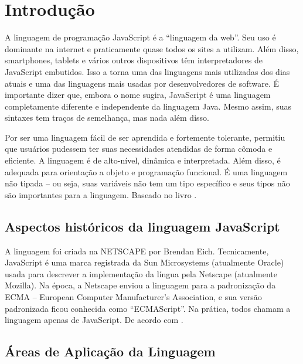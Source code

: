 



\chapter{ Introdu\c{c}\~{a}o}

A linguagem de programação JavaScript é a “linguagem da web”. Seu uso é dominante na internet e praticamente quase todos os sites a utilizam. 
Além disso, smartphones, tablets e vários outros dispositivos têm interpretadores de JavaScript embutidos. 
Isso a torna uma das linguagens mais utilizadas dos dias atuais e uma das linguagens mais usadas por desenvolvedores de software. 
É importante dizer que, embora o nome sugira, JavaScript é uma linguagem completamente diferente e independente da linguagem Java. 
Mesmo assim, suas sintaxes tem traços de semelhança, mas nada além disso. \newline

Por ser uma linguagem fácil de ser aprendida e fortemente tolerante, permitiu que usuários pudessem ter suas necessidades 
atendidas de forma cômoda e eficiente.
 A linguagem é de alto-nível, dinâmica e interpretada. Além disso, é adequada para orientação a objeto e programação funcional. 
 É uma linguagem não tipada – ou seja, suas variáveis não tem um tipo específico e seus tipos não são importantes para a linguagem. 
Baseado no livro \cite{flanagan2020javascript}.

\section{Aspectos hist\'{o}ricos da linguagem JavaScript}
   
A linguagem foi criada na NETSCAPE por Brendan Eich. Tecnicamente, JavaScript é uma marca registrada da Sun Microsystems (atualmente Oracle) usada para descrever a implementação da língua pela Netscape (atualmente Mozilla). Na época, a Netscape enviou a linguagem para a padronização da ECMA – European Computer Manufacturer’s Association, e sua versão padronizada ficou conhecida como “ECMAScript”. Na prática, todos chamam a linguagem apenas de JavaScript.
De acordo com \cite{flanagan2020javascript}.



   \section{\'{A}reas de Aplica\c{c}\~{a}o da Linguagem}

